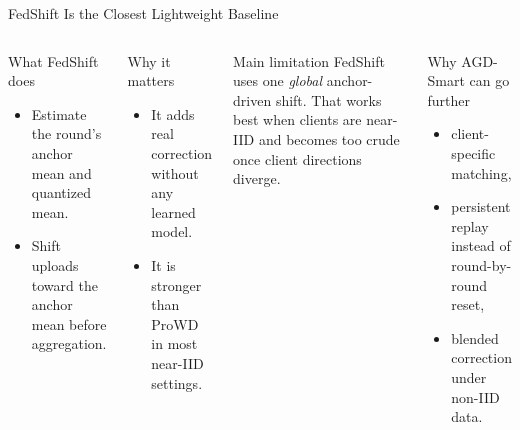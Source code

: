 \documentclass[aspectratio=169,11pt]{beamer}
\begin{document}
\begin{frame}{FedShift Is the Closest Lightweight Baseline}
\footnotesize
\begin{columns}[T,totalwidth=\textwidth]
\begin{block}{What FedShift does}
\begin{itemize}
  \item Estimate the round's anchor mean and quantized mean.
  \item Shift uploads toward the anchor mean before aggregation.
\end{itemize}
\end{block}

\vspace{0.2em}
\begin{block}{Why it matters}
\begin{itemize}
  \item It adds real correction without any learned model.
  \item It is stronger than ProWD in most near-IID settings.
\end{itemize}
\end{block}

\begin{alertblock}{Main limitation}
FedShift uses one \emph{global} anchor-driven shift. That works best when
clients are near-IID and becomes too crude once client directions diverge.
\end{alertblock}

\vspace{0.2em}
\begin{block}{Why AGD-Smart can go further}
\begin{itemize}
  \item client-specific matching,
  \item persistent replay instead of round-by-round reset,
  \item blended correction under non-IID data.
\end{itemize}
\end{block}
\end{columns}
\end{frame}
\end{document}

